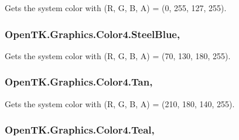 Gets the system color with (R, G, B, A) = (0, 255, 127, 255). 

\hypertarget{struct_open_t_k_1_1_graphics_1_1_color4_a7caf84fc357707b6d4ef01f5f79b1add}{
\subsubsection[{Steel\-Blue}]{ Open\-T\-K.\-Graphics.\-Color4.\-Steel\-Blue\hspace{0.3cm}{\ttfamily [static]}, {\ttfamily [get]}}}\label{struct_open_t_k_1_1_graphics_1_1_color4_a7caf84fc357707b6d4ef01f5f79b1add}


Gets the system color with (R, G, B, A) = (70, 130, 180, 255). 

\hypertarget{struct_open_t_k_1_1_graphics_1_1_color4_a4b6af7db20547e600f27fdf4ab0960bc}{
\subsubsection[{Tan}]{ Open\-T\-K.\-Graphics.\-Color4.\-Tan\hspace{0.3cm}{\ttfamily [static]}, {\ttfamily [get]}}}\label{struct_open_t_k_1_1_graphics_1_1_color4_a4b6af7db20547e600f27fdf4ab0960bc}


Gets the system color with (R, G, B, A) = (210, 180, 140, 255). 

\hypertarget{struct_open_t_k_1_1_graphics_1_1_color4_a26f93d61d0f68ebcaf2e0750f3d0b4bc}{
\subsubsection[{Teal}]{ Open\-T\-K.\-Graphics.\-Color4.\-Teal\hspace{0.3cm}{\ttfamily [static]}, {\ttfamily [get]}}}\label{struct_open_t_k_1_1_graphics_1_1_color4_a26f93d61d0f68ebcaf2e0750f3d0b4bc}


